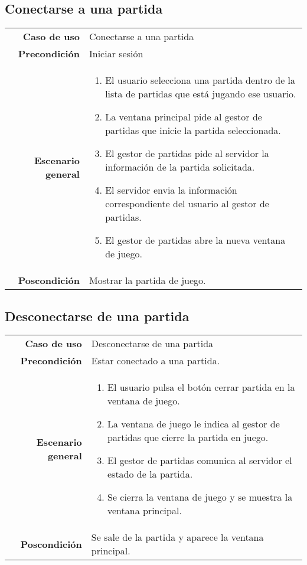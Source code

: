 \subsection{Conectarse a una partida}
{\footnotesize
\begin{tabularx}{0.95\textwidth}{r|X}

\textbf{Caso de uso} & Conectarse a una partida \\

\textbf{Precondición} &  Iniciar sesión\\

\textbf{Escenario general} & \begin{enumerate}
\item El usuario selecciona una partida dentro de la lista de partidas que está 
jugando ese usuario.
\item La ventana principal pide al gestor de partidas que inicie la partida 
seleccionada.
\item El gestor de partidas pide al servidor la información de la partida 
solicitada.
\item El servidor envia la información correspondiente del usuario al gestor de 
partidas.
\item El gestor de partidas abre la nueva ventana de juego. 

\end{enumerate} \\

\textbf{Poscondición} & Mostrar la partida de juego.

\end{tabularx}
}

\subsection{Desconectarse de una partida}
{\footnotesize
\begin{tabularx}{0.95\textwidth}{r|X}

\textbf{Caso de uso} & Desconectarse de una partida \\

\textbf{Precondición} &  Estar conectado a una partida.\\

\textbf{Escenario general} & \begin{enumerate}
\item El usuario pulsa el botón cerrar partida en la ventana de juego.
\item La ventana de juego le indica al gestor de partidas que cierre la partida
en juego.
\item El gestor de partidas comunica al servidor el estado de la partida.
\item Se cierra la ventana de juego y se muestra la ventana principal.

\end{enumerate} \\

\textbf{Poscondición} & Se sale de la partida y aparece la ventana principal.

\end{tabularx}
}

